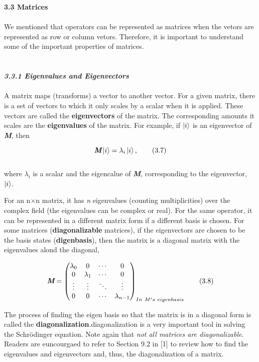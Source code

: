 \documentclass{article}
\begin{document}
\textbf{\Large 3.3 Matrices}
\\
\\
We mentioned that operators can be represented as matrices when the vetors are represented as row or column vetors.
Therefore, it is important to understand some of the important properties of matrices.
\\
\\
\\
\textbf{\textit{\large 3.3.1 Eigenvalues and Eigenvectors}}
\\
\\
A matrix maps (transforms) a vector to another vector. For a given matrix, there is a set of vectors
to which it only scales by a scalar when it is applied. These vectors are called the \textbf{eigenvectors} of the matrix.
The corresponding amounts it scales are the \textbf{eigenvalues} of the matrix. For example, if $\ket{i}$ is an eigenvector of \textit{\textbf{M}}, then

\begin{equation} \label{3.7}
    \textit{\textbf{M}} \ket{i}=\lambda_{i}\ket{i}, \tag{3.7}
\end{equation}
\\
where $\lambda_{i}$ is a scalar and the eigencalue of \textit{\textbf{M}}, corresponding to the eigenvector, $\ket{i}$.


For an n$\times$n matrix, it has \textit{n} eigenvalues (counting multiplicities) over the complex field (the eigenvalues can be complex or real). For the same operator, it can be represented in a different matrix form if a different basis is chosen. For some
matrices (\textbf{diagonalizable} matrices), if the eigenvectors are chosen to be the basis states (\textbf{digenbasis}), then the matrix is a diagonal matrix with the eigenvalues alond the diagonal,

\begin{align*} \label{eq 3.8}
    \textit{\textbf{M}}=\begin{pmatrix}
        \lambda_{0} & 0 & \cdots & 0\\
       0 & \lambda_{1} & \cdots & 0 \\
       \vdots & \vdots & \ddots & \vdots\\
       0 & 0 & \cdots & \lambda_{n-1}\\
    \end{pmatrix}_{In \ M's \ eigenbasis} \tag{3.8}
\end{align*}


The process of finding the eigen basis so that the matrix is in a diagonal form is called the \textbf{diagonalization}.diagonalization is a very important tool in solving the Schr\"{o}dinger equation. Note again that \textit{not all matrices are diagonalizable}. Readers are euncourgaed to refer to Section 9.2 in [1] to review how to find the eigenvalues and eigenvectors and, thus, the diagonalization of a matrix.
\end{document}
